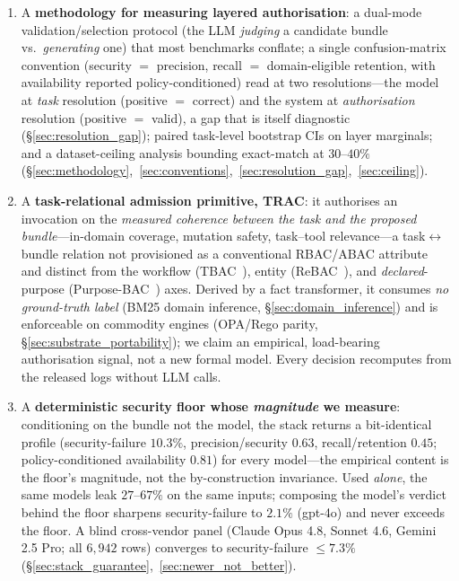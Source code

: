 \documentclass[sigconf,review,anonymous]{acmart}
\begin{document}
\begin{enumerate}
  \item A \textbf{methodology for measuring layered authorisation}: a dual-mode validation/selection protocol (the LLM \emph{judging} a candidate bundle vs.\ \emph{generating} one) that most benchmarks conflate; a single confusion-matrix convention (security $=$ precision, recall $=$ domain-eligible retention, with availability reported policy-conditioned) read at two resolutions---the model at \emph{task} resolution (positive $=$ correct) and the system at \emph{authorisation} resolution (positive $=$ valid), a gap that is itself diagnostic (\S\ref{sec:resolution_gap}); paired task-level bootstrap CIs on layer marginals; and a dataset-ceiling analysis bounding exact-match at $30$--$40\%$ (\S\ref{sec:methodology},~\ref{sec:conventions},~\ref{sec:resolution_gap},~\ref{sec:ceiling}).

  \item A \textbf{task-relational admission primitive, TRAC}: it authorises an invocation on the \emph{measured coherence between the task and the proposed bundle}---in-domain coverage, mutation safety, task--tool relevance---a task$\leftrightarrow$bundle relation not provisioned as a conventional RBAC/ABAC attribute and distinct from the workflow (TBAC~\cite{thomas1997tbac}), entity (ReBAC~\cite{fong2011rebac}), and \emph{declared}-purpose (Purpose-BAC~\cite{byun2005purpose}) axes. Derived by a fact transformer, it consumes \emph{no ground-truth label} (BM25 domain inference, \S\ref{sec:domain_inference}) and is enforceable on commodity engines (OPA/Rego parity, \S\ref{sec:substrate_portability}); we claim an empirical, load-bearing authorisation signal, not a new formal model. Every decision recomputes from the released logs without LLM calls.

  \item A \textbf{deterministic security floor whose \emph{magnitude} we measure}: conditioning on the bundle not the model, the stack returns a bit-identical profile (security-failure $10.3\%$, precision/security $0.63$, recall/retention $0.45$; policy-conditioned availability $0.81$) for every model---the empirical content is the floor's magnitude, not the by-construction invariance. Used \emph{alone}, the same models leak $27$--$67\%$ on the same inputs; composing the model's verdict behind the floor sharpens security-failure to $2.1\%$ (gpt-4o) and never exceeds the floor. A blind cross-vendor panel (Claude Opus 4.8, Sonnet 4.6, Gemini 2.5 Pro; all $6{,}942$ rows) converges to security-failure $\leq\!7.3\%$ (\S\ref{sec:stack_guarantee},~\ref{sec:newer_not_better}).


\end{enumerate}
\end{document}
